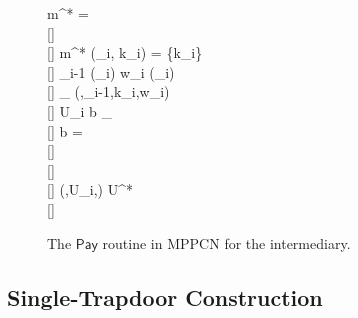 \begin{figure*}[tb]
{{	\< \pcind \pcif m^* = \bot \pcthen \< \\ [-0.15\baselineskip][]
	\< \pcind \pcind \pcabort \< \\ [-0.15\baselineskip][]
	\< \pcind {} m^*  (\lid_i, k_i)   =  \cup \{k_i\} \< \\ [-0.15\baselineskip][]
	\< \pcind {} \lid_{i-1} \gets {}(\lid_i)  w_i \gets {}(\lid_i) \< \\ [-0.15\baselineskip][]
	\< \pcind {} \FF_{}  (\Release,\lid_{i-1},k_i,w_i) \< \\ [-0.15\baselineskip][]
	\< \pcind U_i  b  \FF_{} \< \\ [-0.15\baselineskip][]
	\< \pcind \pcif b = \bot \pcthen \< \\ [-0.15\baselineskip][]
	\< \pcind \pcind \pcabort \< \\ [-0.15\baselineskip][]
	\< \pcelse \< \\ [-0.15\baselineskip][]
	\< \pcind {} (,U_i,\bot)  U^* \< \\ [-0.15\baselineskip][]
	\< \pcind \pcabort
}}

\caption{The $\mathsf{Pay}$ routine in MPPCN for the intermediary.}
\label{fig:mppcn-intermediary}
\end{figure*}

\subsection{Single-Trapdoor Construction}

